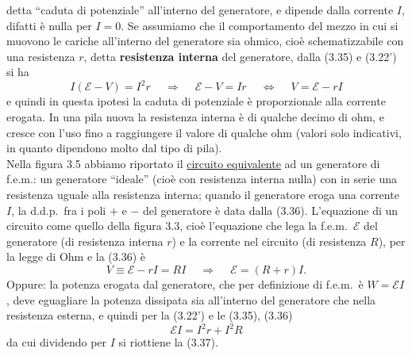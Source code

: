 detta ``caduta di potenziale'' all'interno del generatore, e dipende dalla
corrente $I$, difatti \`e nulla per $I=0$. Se assumiamo che il comportamento del
mezzo in cui si muovono le cariche all'interno del generatore sia ohmico, cio\`e
schematizzabile con una resistenza $r$, detta \textbf{resistenza interna} del
generatore, dalla (3.35) e (3.22') si ha
\begin{equation}
  I(\mathcal E-V)=I^2r\quad\ \Rightarrow
  \quad\ \mathcal E-V=Ir\quad\ \Leftrightarrow\quad\ V=\mathcal E-rI
  \tag{3.36}
\end{equation}
e quindi in questa ipotesi la caduta di potenziale \`e proporzionale alla
corrente erogata. In una pila nuova la resistenza interna \`e di qualche decimo
di ohm, e cresce con l'uso fino a raggiungere il valore di qualche ohm (valori
solo indicativi, in quanto dipendono molto dal tipo di pila).\\
Nella figura 3.5 abbiamo riportato il \underline{circuito equivalente} ad un
generatore di f.e.m.: un generatore ``ideale'' (cio\`e con resistenza interna
nulla) con in serie una resistenza uguale alla resistenza interna; quando il
generatore eroga una corrente $I$, la d.d.p.\ fra i poli $+$ e $-$ del
generatore \`e data dalla (3.36).
L'equazione di un circuito come quello della figura 3.3, cio\`e l'equazione che
lega la f.e.m.\ $\mathcal E$ del generatore (di resistenza interna $r$) e la
corrente nel circuito (di resistenza $R$), per la legge di Ohm e la (3.36) \`e
\begin{equation}
  V\equiv\mathcal E-rI=RI\quad\ \Rightarrow\quad\ \mathcal E=(R+r)I.
  \tag{3.37}
\end{equation}
Oppure: la potenza erogata dal generatore, che per definizione di f.e.m.\ \`e
$W=\mathcal EI$, deve eguagliare la potenza dissipata sia all'interno del
generatore che nella resistenza
esterna, e quindi per la (3.22') e le (3.35), (3.36)
\begin{equation}
  \mathcal EI=I^2r+I^2R
  \tag{3.38}
\end{equation}
da cui dividendo per $I$ si riottiene la (3.37).

